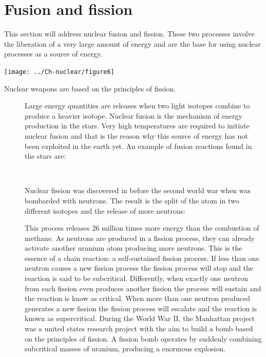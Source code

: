 \documentclass[main.tex]{subfiles}
\begin{document}
\section{Fusion and fission}
This section will address nuclear fusion and fission. These two processes involve the liberation of a very large amount of energy and are the base for using nuclear processes as a source of energy.
\begin{marginfigure}[-11cm]%
      \texttt{[image: ../Ch-nuclear/figure6]}
      \caption{Nuclear weapons are based on the principles of fission.}
	\end{marginfigure}%
\sloppy 
\begin{description}
\item[] Large energy quantities are releases when two light isotopes combine to produce a heavier isotope. Nuclear fusion is the mechanism of energy production in the stars. Very high temperatures are required to initiate nuclear fusion and that is the reason why this source of energy has not been exploited in the earth yet. An example of fusion reactions found in the stars are:
\begin{center}\\
\end{center}
\item[] Nuclear fission was discovered in before the second world war when  was bombarded with neutrons. The result is the split of the atom in two different isotopes and the release of more neutrons:
\begin{center}\end{center}
This process releases 26 million times more energy than the combustion of methane. As neutrons are produced in a fission process, they can already activate another uranium atom producing more neutrons. This is the essence of a chain reaction: a self-sustained fission process. If less than one neutron causes a new fission process the fission process will stop and the reaction is said to be subcritical. Differently, when exactly one neutron from each fission even produces another fission the process will sustain and the reaction is know as critical. When more than one neutron produced generates a new fission the fission process will escalate and the reaction is known as supercritical. During the World War II, the Manhattan project was a united states research project with the aim to build a bomb based on the principles of fission. A fission bomb operates by suddenly combining subcritical masses of uranium, producing a enormous explosion.

\end{description}
\end{document}
